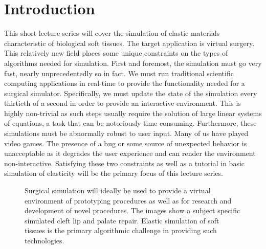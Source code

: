 \section*{Introduction}

This short lecture series will cover the simulation of elastic materials characteristic of biological soft tissues. The target application is virtual surgery. This relatively new field places some unique constraints on the types of algorithms needed for simulation. First and foremost, the simulation must go very fast, nearly unprecedentedly so in fact. We must run traditional scientific computing applications in real-time to provide the functionality needed for a surgical simulator. Specifically, we must update the state of the simulation every thirtieth of a second in order to provide an interactive environment. This is highly non-trivial as such steps usually require the solution of large linear systems of equations, a task that can be notoriously time consuming. Furthermore, these simulations must be abnormally robust to user input. Many of us have played video games. The presence of a bug or some source of unexpected behavior is unacceptable as it degrades the user experience and can render the environment non-interactive. Satisfying these two constraints as well as a tutorial in basic simulation of elasticity will be the primary focus of this lecture series.

\begin{figure}
\caption{Surgical simulation will ideally be used to provide a virtual environment of prototyping procedures as well as for research and development of novel procedures. The images show a subject specific simulated cleft lip and palate repair. Elastic simulation of soft tissues is the primary algorithmic challenge in providing such technologies.}
\end{figure}

